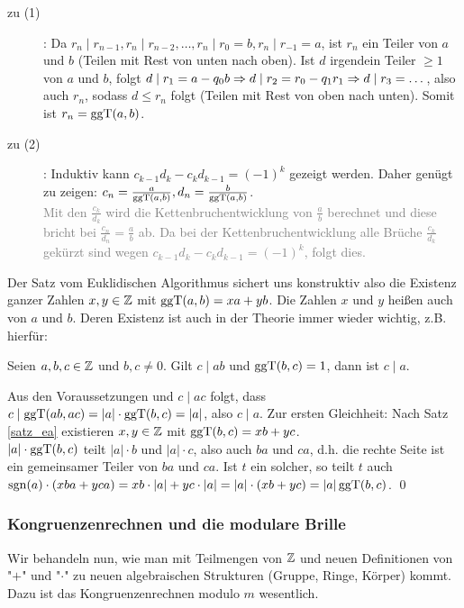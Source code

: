 	\begin{description}
		\item[zu (1)]: Da $r_n \mid r_{n-1}, r_n \mid r_{n-2}, \dots, r_n \mid r_0 = b, r_n \mid r_{-1} = a$, ist $r_n$ ein Teiler von $a$ und $b$ (Teilen mit Rest von unten nach oben). 
		Ist $d$ irgendein Teiler $\geq 1$ von $a$ und $b$, folgt $d \mid r_1 = a -q_0 b \Rightarrow d \mid r_2 = r_0 - q_1 r_1 \linebreak \Rightarrow d \mid r_3 = \dots$, also auch $r_n$, sodass $d \leq r_n$ folgt (Teilen mit Rest von oben nach unten). 
		Somit ist $r_n = \operatorname{ggT}(a,b)$.
		\item[zu (2)]: Induktiv kann $c_{k-1} d_k - c_k d_{k-1} = (-1)^k$ gezeigt werden. 
		Daher genügt zu zeigen: $c_n = \frac{a}{\operatorname{ggT}(a,b)}, d_n = \frac{b}{\operatorname{ggT}(a,b)}$. 
		 \\
		\textcolor{gray}{Mit den $\frac{c_k}{d_k}$ wird die Kettenbruchentwicklung von $\frac{a}{b}$ berechnet und diese bricht bei $\frac{c_n}{d_n} = \frac{a}{b}$ ab. 
		Da bei der Kettenbruchentwicklung alle Brüche $\frac{c_k}{d_k}$ gekürzt sind wegen $c_{k-1} d_k - c_k d_{k-1} = (-1)^k$, folgt dies.} 
	\end{description}
	
Der Satz vom Euklidischen Algorithmus sichert uns konstruktiv also die Existenz ganzer Zahlen $x,y \in \mathbb{Z}$ mit $\operatorname{ggT}(a,b) = xa + yb$. 
Die Zahlen $x$ und $y$ heißen auch  von $a$ und $b$. 
Deren Existenz ist auch in der Theorie immer wieder wichtig, z.B. hierfür:

\begin{lemma}
\label{lemma_21}
	Seien $a,b,c \in \mathbb{Z}$ und $b,c \neq 0$. 
	Gilt $c \mid ab$ und $\operatorname{ggT}(b,c) = 1$, dann ist $c \mid a$.
\end{lemma}

	Aus den Voraussetzungen und $c \mid ac$ folgt, dass $c \mid \operatorname{ggT}(ab,ac) = |a| \cdot \operatorname{ggT}(b,c) = |a|$, also $c \mid a$. 
	Zur ersten Gleichheit: Nach Satz \ref{satz_ea} existieren $x,y \in \mathbb{Z}$ mit $\operatorname{ggT}(b,c) = xb + yc$. \\
	$|a| \cdot \operatorname{ggT}(b,c)$ teilt $|a|\cdot b$ und $|a| \cdot c$, also auch $ba$ und $ca$, d.h. die rechte Seite ist ein gemeinsamer Teiler von $ba$ und $ca$. 
	Ist $t$ ein solcher, so teilt $t$ auch $\operatorname{sgn}(a) \cdot(xba + yca) = xb \cdot |a| + yc \cdot |a| = |a| \cdot (xb + yc) = |a| \operatorname{ggT}(b,c)$. \qed

\nextlecture	
\subsubsection{Kongruenzenrechnen und die modulare Brille}
	Wir behandeln nun,\marginnote{[3]} wie man mit Teilmengen von $\mathbb{Z}$ und neuen Definitionen von "$+$" und "$\cdot$" zu neuen algebraischen Strukturen (Gruppe, Ringe, Körper) kommt. 
	Dazu ist das Kongruenzenrechnen modulo $m$ wesentlich.
	
